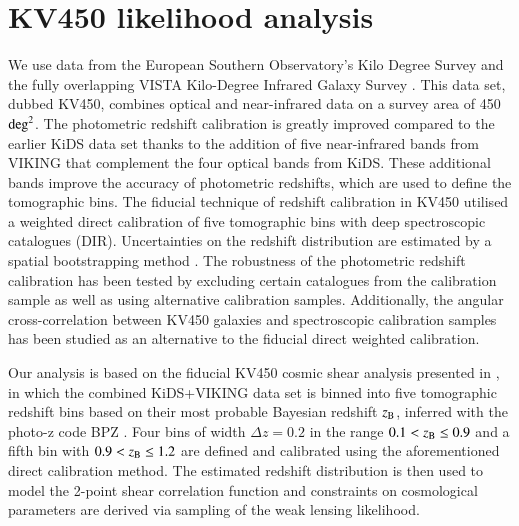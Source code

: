 \documentclass{aa}
\begin{document}
\section{KV450 likelihood analysis}
\label{sec:results}
We use data from the European Southern Observatory's Kilo Degree Survey \citep[KiDS; ][]{kuijken15, kuijken19,dejong15,dejong17} and the fully overlapping VISTA Kilo-Degree Infrared Galaxy Survey \citep[VIKING; ][]{2013Msngr.154...32E}. This data set, dubbed KV450, combines optical and near-infrared data on a survey area of 450 ${\rm deg}^2$. The photometric redshift calibration is greatly improved compared to the earlier KiDS data set \citep{hildebrandt17} thanks to the addition of five near-infrared bands from VIKING that complement the four optical bands from KiDS. These additional bands improve the accuracy of photometric redshifts, which are used to define the tomographic bins. The fiducial technique of redshift calibration in KV450 utilised a weighted direct calibration of five tomographic bins with deep spectroscopic catalogues (DIR). Uncertainties on the redshift distribution are estimated by a spatial bootstrapping method \citep{hildebrandt18}. The robustness of the photometric redshift calibration has been tested by excluding certain catalogues from the calibration sample as well as using alternative calibration samples. Additionally, the angular cross-correlation between KV450 galaxies and spectroscopic calibration samples has been studied as an alternative to the fiducial direct weighted calibration.

Our analysis is based on the fiducial KV450 cosmic shear analysis presented in \cite{hildebrandt18}, in which the combined KiDS+VIKING data set \citep{2019A&A...632A..34W} is binned into five tomographic redshift bins based on their most probable Bayesian redshift $z_{\rm B}$, inferred with the photo-z code {\sc BPZ} \citep{2000ApJ...536..571B}. Four bins of width $\Delta z = 0.2$ in the range $0.1 < z_{\rm B} \leq 0.9$ and a fifth bin with $0.9 < z_{\rm B} \leq 1.2$ are defined and calibrated using the aforementioned direct calibration method. The estimated redshift distribution is then used to model the 2-point shear correlation function and constraints on cosmological parameters are derived via sampling of the weak lensing likelihood. 
\end{document}
